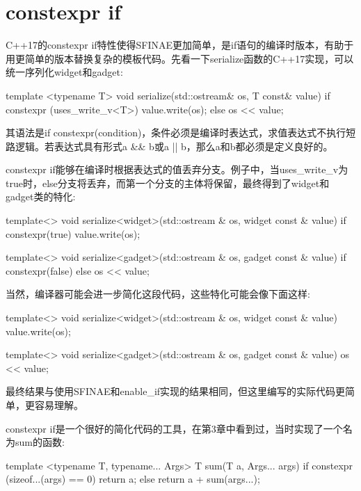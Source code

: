 \section{constexpr if}
C++17的constexpr if特性使得SFINAE更加简单，是if语句的编译时版本，有助于用更简单的版本替换复杂的模板代码。先看一下serialize函数的C++17实现，可以统一序列化widget和gadget:

\begin{cpp}
template <typename T>
void serialize(std::ostream& os, T const& value)
{
	if constexpr (uses_write_v<T>)
		value.write(os);
	else
		os << value;
}
\end{cpp}

其语法是if constexpr(condition)，条件必须是编译时表达式，求值表达式不执行短路逻辑。若表达式具有形式a \&\& b或a || b，那么a和b都必须是定义良好的。

constexpr if能够在编译时根据表达式的值丢弃分支。例子中，当uses\_write\_v为true时，else分支将丢弃，而第一个分支的主体将保留，最终得到了widget和gadget类的特化:

\begin{cpp}
template<>
void serialize<widget>(std::ostream & os,
                      widget const & value)
{
	if constexpr(true)
	{
		value.write(os);
	}
}

template<>
void serialize<gadget>(std::ostream & os,
                      gadget const & value)
{
	if constexpr(false)
	{
	}
	else
	{
		os << value;
	}
}
\end{cpp}

当然，编译器可能会进一步简化这段代码，这些特化可能会像下面这样:

\begin{cpp}
template<>
void serialize<widget>(std::ostream & os,
                       widget const & value)
{
	value.write(os);
}

template<>
void serialize<gadget>(std::ostream & os,
					   gadget const & value)
{
	os << value;
}
\end{cpp}

最终结果与使用SFINAE和enable\_if实现的结果相同，但这里编写的实际代码更简单，更容易理解。

constexpr if是一个很好的简化代码的工具，在第3章中看到过，当时实现了一个名为sum的函数:

\begin{cpp}
template <typename T, typename... Args>
T sum(T a, Args... args)
{
	if constexpr (sizeof...(args) == 0)
		return a;
	else
		return a + sum(args...);
}
\end{cpp}

